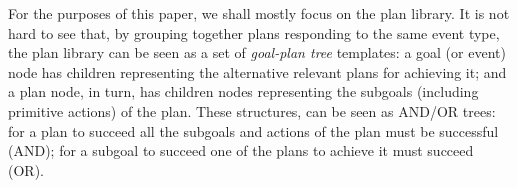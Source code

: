 



For the purposes of this paper, we shall mostly focus on the plan library.
It is not hard to see that, by grouping together plans responding to the same
event type, the plan library can be seen as a set of \emph{goal-plan tree}
templates: a goal (or event) node has children representing the alternative
relevant plans for achieving it; and a plan node, in turn, has children nodes
representing the subgoals (including primitive actions) of the plan.
These structures, can be seen as AND/OR trees: for a plan to succeed all the
subgoals and actions of the plan must be successful (AND); for a subgoal to
succeed one of the plans to achieve it must succeed (OR).


